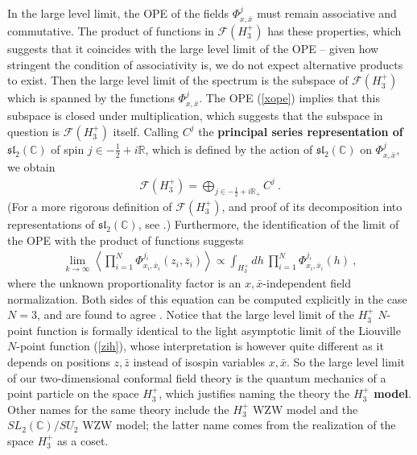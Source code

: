 \documentclass[12pt,a4paper,notitlepage]{report}
\newcommand \R {\mathbb{R}}
\newcommand \C {\mathbb{C}}
\numberwithin{equation}{section}
\theoremstyle{break}
\begin{document}
In the large level limit, the OPE of the fields $\Phi^j_{x,\bar{x}}$ must remain associative and commutative. 
The product of functions in $\mathcal{F}(H_3^+)$ has these properties, which suggests that it coincides with the large level limit of the OPE -- given how stringent the condition of associativity is, we do not expect alternative products to exist. 
Then the large level limit of the spectrum is the subspace of 
$\mathcal{F}(H_3^+)$ which is spanned by the functions $\Phi^j_{x,\bar{x}}$.
The OPE (\ref{xope}) implies that this subspace is closed under multiplication, which suggests that the subspace in question is $\mathcal{F}(H_3^+)$ itself. 
Calling $C^j$ the \textbf{\boldmath principal series representation of $\mathfrak{sl}_2(\C)$}\index{principal series representation of $\mathfrak{sl}_2(\C)$} of spin $j\in -\frac12 +i\R$, which is defined by the action of $\mathfrak{sl}_2(\C)$ on $\Phi^j_{x,\bar{x}}$, we obtain
\begin{align}
 \mathcal{F}(H_3^+) = \bigoplus_{j\in -\frac12+i\R_+} C^j\ .
\end{align}
(For a more rigorous definition of $\mathcal{F}(H_3^+)$, and proof of its decomposition into representations of $\mathfrak{sl}_2(\C)$, see \cite{tes97b}.)
Furthermore, the identification of the limit of the OPE with the product of functions suggests
\begin{align}
 \underset{k\rightarrow \infty}{\lim} \left\langle \prod_{i=1}^N \Phi^{j_i}_{x_i,\bar{x}_i}(z_i,\bar{z}_i)\right\rangle \propto \int_{H_3^+} dh\ \prod_{i=1}^N \Phi^{j_i}_{x_i,\bar{x}_i}(h)\ , 
\end{align}
where the unknown proportionality factor is an $x,\bar{x}$-independent field normalization. Both sides of this equation can be computed explicitly in the case $N=3$, and are found to agree \cite{tes97b}. Notice that the large level limit of the $H_3^+$ $N$-point function is formally identical to the light asymptotic limit of the Liouville $N$-point function (\ref{zih}), whose interpretation is however quite different as it depends on positions $z,\bar{z}$ instead of isospin variables $x,\bar{x}$. So the large level limit of our two-dimensional conformal field theory is the quantum mechanics of a point particle on the space $H_3^+$, which justifies naming the theory the \textbf{\boldmath $H_3^+$ model}. Other names for the same theory include the $H_3^+$ WZW model and the $SL_2(\C)/SU_2$ WZW model; the latter name comes from the realization of the space $H_3^+$ as a coset.
\end{document}
